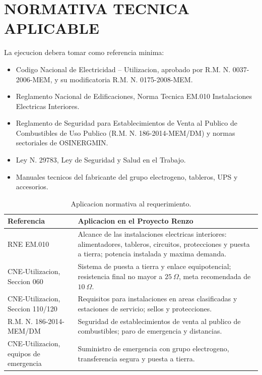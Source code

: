 \documentclass[12pt,letterpaper]{report}
\newcommand{\reqheader}{\rowcolor{azulunap!14}}
\begin{document}
\section{NORMATIVA TECNICA APLICABLE}

La ejecucion debera tomar como referencia minima:

\begin{itemize}
  \item Codigo Nacional de Electricidad -- Utilizacion, aprobado por R.M. N. 0037-2006-MEM, y su modificatoria R.M. N. 0175-2008-MEM.
  \item Reglamento Nacional de Edificaciones, Norma Tecnica EM.010 Instalaciones Electricas Interiores.
  \item Reglamento de Seguridad para Establecimientos de Venta al Publico de Combustibles de Uso Publico (R.M. N. 186-2014-MEM/DM) y normas sectoriales de OSINERGMIN.
  \item Ley N. 29783, Ley de Seguridad y Salud en el Trabajo.
  \item Manuales tecnicos del fabricante del grupo electrogeno, tableros, UPS y accesorios.
\end{itemize}

\begin{table}[H]
\centering
\caption{Aplicacion normativa al requerimiento.}
\renewcommand{\arraystretch}{1.18}
\begin{tabularx}{\textwidth}{P{0.32\textwidth} L}
\toprule
\reqheader \textbf{Referencia} & \textbf{Aplicacion en el Proyecto Renzo} \\
\midrule
RNE EM.010 & Alcance de las instalaciones electricas interiores: alimentadores, tableros, circuitos, protecciones y puesta a tierra; potencia instalada y maxima demanda. \\
CNE-Utilizacion, Seccion 060 & Sistema de puesta a tierra y enlace equipotencial; resistencia final no mayor a \(25\ \Omega\), meta recomendada de \(10\ \Omega\). \\
CNE-Utilizacion, Seccion 110/120 & Requisitos para instalaciones en areas clasificadas y estaciones de servicio; sellos y protecciones. \\
R.M. N. 186-2014-MEM/DM & Seguridad de establecimientos de venta al publico de combustibles; paro de emergencia y distancias. \\
CNE-Utilizacion, equipos de emergencia & Suministro de emergencia con grupo electrogeno, transferencia segura y puesta a tierra. \\
\bottomrule
\end{tabularx}
\end{table}
\end{document}

